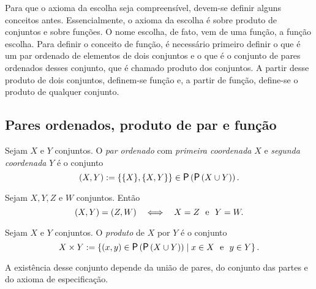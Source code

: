 Para que o axioma da escolha seja compreensível, devem-se definir alguns conceitos antes. Essencialmente, o axioma da escolha é sobre produto de conjuntos e sobre funções. O nome escolha, de fato, vem de uma função, a função escolha. Para definir o conceito de função, é necessário primeiro definir o que é um par ordenado de elementos de dois conjuntos e o que é o conjunto de pares ordenados desses conjunto, que é chamado produto dos conjuntos. A partir desse produto de dois conjuntos, definem-se função e, a partir de função, define-se o produto de qualquer conjunto.

\subsection*{Pares ordenados, produto de par e função}

\begin{definition}
Sejam $X$ e $Y$ conjuntos. O \emph{par ordenado} com \emph{primeira coordenada} $X$ e \emph{segunda coordenada} $Y$ é o conjunto
	\begin{equation*}
	(X,Y) := \{\{X\},\{X,Y\}\} \in \p\left(\p\left(X \cup Y\right)\right).
	\end{equation*}
\end{definition}

\begin{proposition}
Sejam $X,Y,Z$ e $W$ conjuntos. Então
	\begin{equation*}
	(X,Y) = (Z,W) \quad \Longleftrightarrow \quad X=Z \text{\ \ e\ \ } Y=W.
	\end{equation*}
\end{proposition}

\begin{definition}
Sejam $X$ e $Y$ conjuntos. O \emph{produto} de $X$ por $Y$ é o conjunto
	\begin{equation*}
	X \times Y := \set{(x,y) \in \p\left(\p\left(X \cup Y\right)\right)}{x \in X \text{\ \ e\ \ } y \in Y}.
	\end{equation*}
\end{definition}

A existência desse conjunto depende da união de pares, do conjunto das partes e do axioma de especificação.

